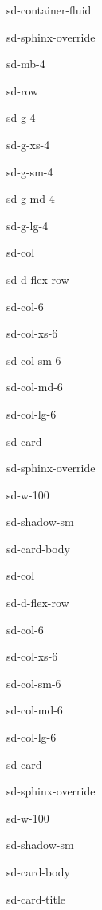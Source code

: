 \documentclass[letterpaper,10pt,english]{jupyterBook}
\let\sphinxpxdimen\pdfpxdimen\else\newdimen\sphinxpxdimen
\begin{document}
\begin{sphinxuseclass}{sd-container-fluid}
\begin{sphinxuseclass}{sd-sphinx-override}
\begin{sphinxuseclass}{sd-mb-4}
\begin{sphinxuseclass}{sd-row}
\begin{sphinxuseclass}{sd-g-4}
\begin{sphinxuseclass}{sd-g-xs-4}
\begin{sphinxuseclass}{sd-g-sm-4}
\begin{sphinxuseclass}{sd-g-md-4}
\begin{sphinxuseclass}{sd-g-lg-4}
\begin{sphinxuseclass}{sd-col}
\begin{sphinxuseclass}{sd-d-flex-row}
\begin{sphinxuseclass}{sd-col-6}
\begin{sphinxuseclass}{sd-col-xs-6}
\begin{sphinxuseclass}{sd-col-sm-6}
\begin{sphinxuseclass}{sd-col-md-6}
\begin{sphinxuseclass}{sd-col-lg-6}
\begin{sphinxuseclass}{sd-card}
\begin{sphinxuseclass}{sd-sphinx-override}
\begin{sphinxuseclass}{sd-w-100}
\begin{sphinxuseclass}{sd-shadow-sm}
\begin{sphinxuseclass}{sd-card-body}
\noindent{\hspace*{\fill}\sphinxincludegraphics[width=200\sphinxpxdimen]{{whipple-tucker}.png}\hspace*{\fill}}

\sphinxAtStartPar
{}

\end{sphinxuseclass}
\end{sphinxuseclass}
\end{sphinxuseclass}
\end{sphinxuseclass}
\end{sphinxuseclass}
\end{sphinxuseclass}
\end{sphinxuseclass}
\end{sphinxuseclass}
\end{sphinxuseclass}
\end{sphinxuseclass}
\end{sphinxuseclass}
\end{sphinxuseclass}
\begin{sphinxuseclass}{sd-col}
\begin{sphinxuseclass}{sd-d-flex-row}
\begin{sphinxuseclass}{sd-col-6}
\begin{sphinxuseclass}{sd-col-xs-6}
\begin{sphinxuseclass}{sd-col-sm-6}
\begin{sphinxuseclass}{sd-col-md-6}
\begin{sphinxuseclass}{sd-col-lg-6}
\begin{sphinxuseclass}{sd-card}
\begin{sphinxuseclass}{sd-sphinx-override}
\begin{sphinxuseclass}{sd-w-100}
\begin{sphinxuseclass}{sd-shadow-sm}
\begin{sphinxuseclass}{sd-card-body}
\begin{sphinxuseclass}{sd-card-title}

\end{sphinxuseclass}
\end{sphinxuseclass}
\end{sphinxuseclass}
\end{sphinxuseclass}
\end{sphinxuseclass}
\end{sphinxuseclass}
\end{sphinxuseclass}
\end{sphinxuseclass}
\end{sphinxuseclass}
\end{sphinxuseclass}
\end{sphinxuseclass}
\end{sphinxuseclass}
\end{sphinxuseclass}
\end{sphinxuseclass}
\end{sphinxuseclass}
\end{sphinxuseclass}
\end{sphinxuseclass}
\end{sphinxuseclass}
\end{sphinxuseclass}
\end{sphinxuseclass}
\end{sphinxuseclass}
\end{sphinxuseclass}
\end{document}
